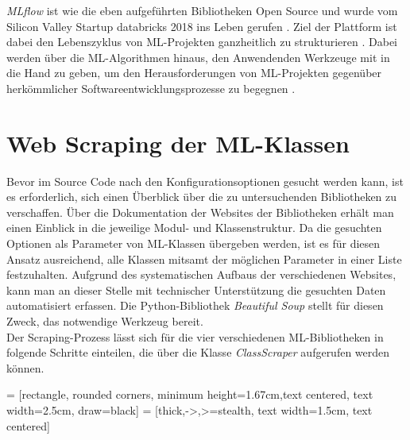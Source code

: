 \documentclass[german,bachelor]{swsLeipzig}
\begin{document}
\textit{MLflow} ist wie die eben aufgeführten Bibliotheken Open Source und wurde vom Silicon Valley Startup databricks 2018 ins Leben gerufen \cite[]{zaharia2018accelerating}.
Ziel der Plattform ist dabei den Lebenszyklus von ML-Projekten ganzheitlich zu strukturieren \cite[]{zaharia2018accelerating}.
Dabei werden über die ML-Algorithmen hinaus, den Anwendenden Werkzeuge mit in die Hand zu geben, um den Herausforderungen
von ML-Projekten gegenüber herkömmlicher Softwareentwicklungsprozesse zu begegnen \cite[]{zaharia2018accelerating}.\\


\section{Web Scraping der ML-Klassen}\label{scrape}
Bevor im Source Code nach den Konfigurationsoptionen gesucht werden kann, ist es erforderlich, sich einen Überblick über
die zu untersuchenden Bibliotheken zu verschaffen.
Über die Dokumentation der Websites der Bibliotheken erhält man einen Einblick in die jeweilige Modul- und Klassenstruktur.
Da die gesuchten Optionen als Parameter von ML-Klassen übergeben werden, ist es für diesen Ansatz ausreichend, alle Klassen
mitsamt der möglichen Parameter in einer Liste festzuhalten.
Aufgrund des systematischen Aufbaus der verschiedenen Websites, kann man an dieser Stelle mit technischer Unterstützung
die gesuchten Daten automatisiert erfassen.
Die Python-Bibliothek \textit{Beautiful Soup} stellt für diesen Zweck, das notwendige Werkzeug bereit.\\

Der Scraping-Prozess lässt sich für die vier verschiedenen ML-Bibliotheken in folgende Schritte einteilen, die über die Klasse
\textit{ClassScraper} aufgerufen werden können.

 = [rectangle, rounded corners, minimum height=1.67cm,text centered, text width=2.5cm, draw=black]
 = [thick,->,>=stealth, text width=1.5cm, text centered]

\begin{center}
\end{center}
\
\end{document}
